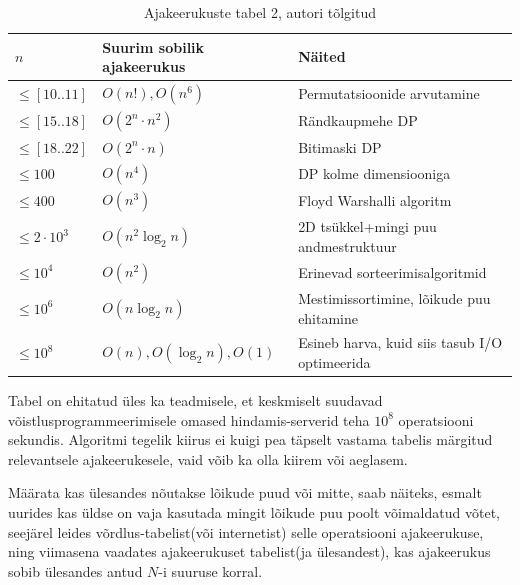 \documentclass{trkut}
\theoremstyle{definition}
\begin{document}
\begin{table}[H]%
   \caption{Ajakeerukuste tabel 2, autori tõlgitud}%
    \begin{tabular}{|l|l|l|}
\hline
$n$               & Suurim sobilik ajakeerukus & Näited                                          \\ \hline
$\le [10..11]$    & $O(n!), O(n^6)$            & Permutatsioonide arvutamine                     \\ \hline
$\le [15..18]$    & $O(2^n\cdot n^2)$          & Rändkaupmehe DP                                 \\ \hline
$\le [18..22]$    & $O(2^n\cdot n)$            & Bitimaski DP                                    \\ \hline
$\le 100$         & $O(n^4)$                   & DP kolme dimensiooniga                          \\ \hline
$\le 400$         & $O(n^3)$                   & Floyd Warshalli algoritm                        \\ \hline
$\le 2\cdot 10^3$ & $O(n^2\log _2 n)$          & 2D tsükkel+mingi puu andmestruktuur             \\ \hline
$\le 10^4$        & $O(n^2)$                   & Erinevad sorteerimisalgoritmid                  \\ \hline
$\le 10^6$        & $O(n\log _2 n)$            & Mestimissortimine, lõikude puu ehitamine        \\ \hline
$\le 10^8$        & $O(n), O(\log _2 n), O(1)$ & Esineb harva, kuid siis tasub I/O optimeerida \\ \hline
\end{tabular}
    \label{idk}%
\end{table}


Tabel on ehitatud üles ka teadmisele, et keskmiselt suudavad võistlusprogrammeerimisele omased hindamis-serverid teha $10^8$ operatsiooni sekundis. Algoritmi tegelik kiirus ei kuigi pea täpselt vastama tabelis märgitud relevantsele ajakeerukesele, vaid võib ka olla kiirem või aeglasem.

Määrata kas ülesandes nõutakse lõikude puud või mitte, saab näiteks, esmalt uurides kas üldse on vaja kasutada mingit lõikude puu poolt võimaldatud võtet, seejärel leides võrdlus-tabelist(või internetist) selle operatsiooni ajakeerukuse, ning viimasena vaadates ajakeerukuset tabelist(ja ülesandest), kas ajakeerukus sobib ülesandes antud $N$-i suuruse korral.
\end{document}
